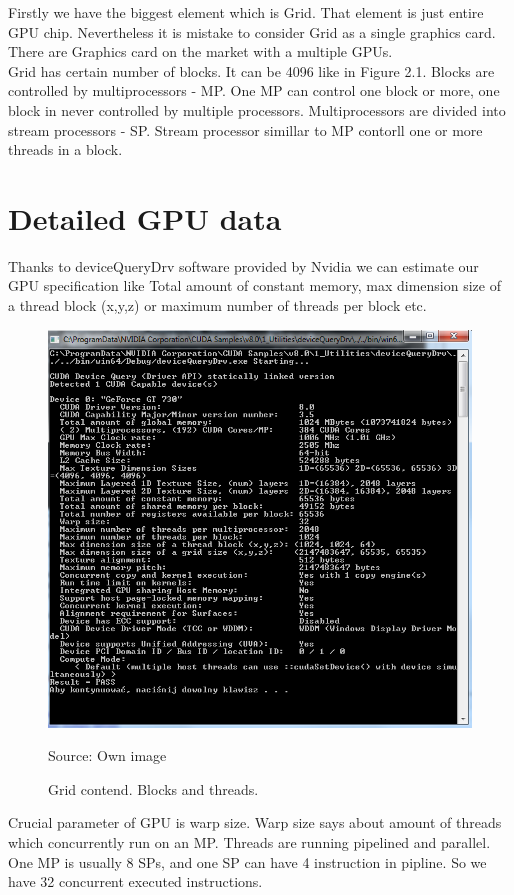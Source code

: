 \documentclass{scrreprt}
\begin{document}
Firstly we have the biggest element which is Grid. 
That element is just entire GPU chip. Nevertheless it is mistake to consider Grid as a single graphics card.
There are Graphics card on the market with a multiple GPUs.
\\
Grid has certain number of blocks. It can be 4096 like in Figure 2.1. 
Blocks are controlled by multiprocessors - MP. One MP can control one block or more, one block in never controlled by multiple processors.
Multiprocessors are divided into stream processors - SP. Stream processor simillar to MP contorll one or more threads in a block.

\section{Detailed GPU data}
Thanks to deviceQueryDrv software provided by Nvidia we can estimate our GPU specification like Total amount of constant memory, max dimension size of a thread block (x,y,z) or maximum number of threads per block etc.\\



\begin{figure}[h!]
\centering
\includegraphics{CUDAParam.PNG}
\caption{Grid contend. Blocks and threads.}
Source: Own image
\end{figure}
\FloatBarrier


Crucial parameter of GPU is warp size. Warp size says about amount of threads which concurrently run on an MP. Threads are running pipelined and parallel. One MP is usually 8 SPs, and one SP can have 4 instruction in pipline. So we have 32 concurrent executed instructions.
\end{document}
